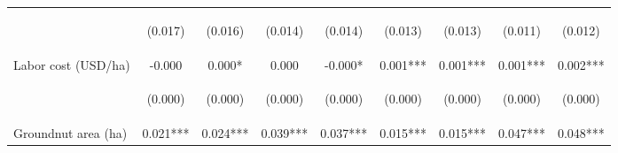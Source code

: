 \begin{center}
\begin{tabular}{lcccccccc}
\vspace{4pt} & \begin{footnotesize}(0.017)\end{footnotesize} & \begin{footnotesize}(0.016)\end{footnotesize} & \begin{footnotesize}(0.014)\end{footnotesize} & \begin{footnotesize}(0.014)\end{footnotesize} & \begin{footnotesize}(0.013)\end{footnotesize} & \begin{footnotesize}(0.013)\end{footnotesize} & \begin{footnotesize}(0.011)\end{footnotesize} & \begin{footnotesize}(0.012)\end{footnotesize} \\
Labor cost (USD/ha) & -0.000 & 0.000* & 0.000 & -0.000* & 0.001*** & 0.001*** & 0.001*** & 0.002*** \\
\vspace{4pt} & \begin{footnotesize}(0.000)\end{footnotesize} & \begin{footnotesize}(0.000)\end{footnotesize} & \begin{footnotesize}(0.000)\end{footnotesize} & \begin{footnotesize}(0.000)\end{footnotesize} & \begin{footnotesize}(0.000)\end{footnotesize} & \begin{footnotesize}(0.000)\end{footnotesize} & \begin{footnotesize}(0.000)\end{footnotesize} & \begin{footnotesize}(0.000)\end{footnotesize} \\
Groundnut area (ha) & 0.021*** & 0.024*** & 0.039*** & 0.037*** & 0.015*** & 0.015*** & 0.047*** & 0.048*** \\

\end{tabular}
\end{center}
